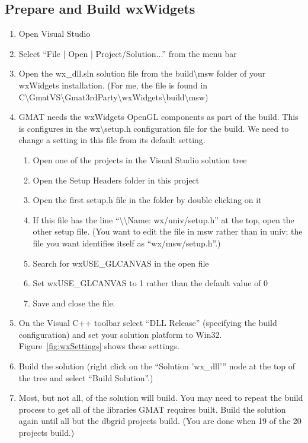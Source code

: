 \documentclass[letterpaper,10pt]{article}%
\begin{document}
\subsection{Prepare and Build wxWidgets}
\begin{enumerate}
\item Open Visual Studio
\item Select ``File | Open | Project/Solution...'' from the menu bar
\item Open the wx\_dll.sln solution file from the build\textbackslash msw folder of your wxWidgets installation.  (For me, the file is found in  C\:\textbackslash GmatVS\textbackslash Gmat3rdParty\textbackslash wxWidgets\textbackslash build\textbackslash msw)
\item GMAT needs the wxWidgets OpenGL components as part of the build.  This is configures in the wx\textbackslash setup.h configuration file for the build.  We need to change a setting in this file from its default setting.
\begin{enumerate}
	\item Open one of the projects in the Visual Studio solution tree
	\item Open the Setup Headers folder in this project
	\item Open the first setup.h file in the folder by double clicking on it
	\item If this file has the line ``\textbackslash\textbackslash  Name:        wx/univ/setup.h'' at the top, open the other setup file. (You want to edit the file in msw rather than in univ; the file you want identifies itself as ``wx/msw/setup.h''.)
	\item Search for wxUSE\_GLCANVAS in the open file
	\item Set wxUSE\_GLCANVAS to 1 rather than the default value of 0
	\item Save and close the file.
\end{enumerate}
\item On the Visual C++ toolbar select ``DLL Release'' (specifying the build configuration) and set your solution platform to Win32.  Figure~\ref{fig:wxSettings} shows these settings.
\item Build the solution (right click on the ``Solution 'wx\_dll'{}'' node at the top of the tree and select ``Build Solution''.)
\item Most, but not all, of the solution will build.  You may need to repeat the build process to get all of the libraries GMAT requires built.  Build the solution again until all but the dbgrid projects build.  (You are done when 19 of the 20 projects build.)

\end{enumerate}
\end{document}
